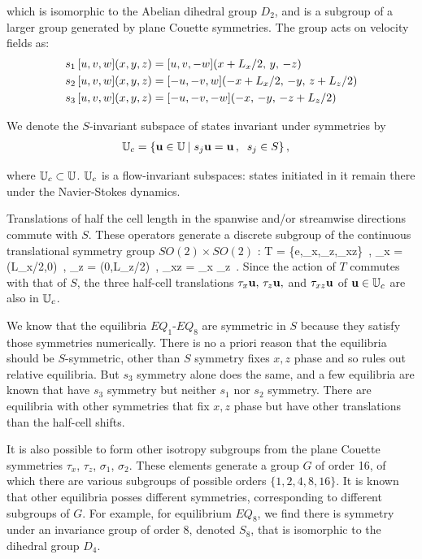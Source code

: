 \documentclass[letter,12pt,openany]{article}
\begin{document}
which is isomorphic to
the Abelian dihedral group $D_2$, and is a subgroup of a larger group generated by plane Couette symmetries. The group acts on velocity fields
as:
\begin{align}
s_1 \, [u, v, w](x,y,z) &= [u, v, -w](x+L_x/2,\, y,\, -z) \nonumber \\ 
s_2 \, [u, v, w](x,y,z) &= [-u, -v, w](-x+L_x/2,\,-y,\,z+L_z/2) \label{shiftRot} \\
s_3 \, [u, v, w](x,y,z) &= [-u,-v,-w](-x,\, -y,\, -z+L_z/2)  \nonumber 
\,
\end{align}


We denote the $S$-invariant subspace of states invariant under
symmetries  by
\begin{align}
\mathbb{U}_{c}  &= \{{\bf u} \in \mathbb{U}  \: | \;
              s_j {\bf u} = {\bf u}\,, \;\;  s_j \in S \}
\,,
\label{symmSubspU}
\end{align}

where $ \mathbb{U}_{c} \subset \mathbb{U}$.
%
$\mathbb{U}_{c}$ is a flow-invariant subspaces: states initiated
in it remain there under the Navier-Stokes dynamics.


Translations of half the cell length in the spanwise and/or streamwise
directions commute with $S$. These operators generate a discrete
subgroup of the continuous translational symmetry group $SO(2) \times
SO(2)$ :
\beq
T = \{e,\tau_x,\tau_z,\tau_{xz}\}
    \,,\qquad
    \tau_x = \tau(L_x/2,0)
    \,,\;
    \tau_z = \tau(0,L_z/2)
    \,,\;
    \tau_{xz} = \tau_x \tau_z
\,.
Since the action of $T$ commutes with that of $S$,
the three half-cell translations $\tau_x {\bf u}, \, \tau_z {\bf u},$ and
$\tau_{xz} {\bf u}$ of ${\bf u} \in \mathbb{U}_{c}$ are also in $\mathbb{U}_{c}$.


We know that the equilibria  $EQ_1$-$EQ_8$ are symmetric in $S$ because they satisfy those symmetries numerically. There is no
a priori reason that the equilibria should be $S$-symmetric, other than $S$ symmetry
fixes $x,z$ phase and so rules out relative equilibria. But $s_3$ symmetry
alone does the same, and a few equilibria are known that have $s_3$ symmetry
but neither $s_1$ nor $s_2$ symmetry. There are equilibria with other symmetries
that fix $x,z$ phase but have other translations than the half-cell shifts.

It is also possible to form other isotropy subgroups from the plane Couette symmetries $\tau_x$, $\tau_z$, $\sigma_1$, $\sigma_2$. These elements generate a group $G$ of order 16, of which there are various subgroups of possible orders $\{1,2,4,8,16\}$. It is known that other equilibria posses different symmetries, corresponding to different subgroups of $G$. For example, for equilibrium $EQ_8$, we find there is symmetry under an invariance group of order 8, denoted $S_8$, that is isomorphic to the dihedral group $D_4$. 
\end{document}
